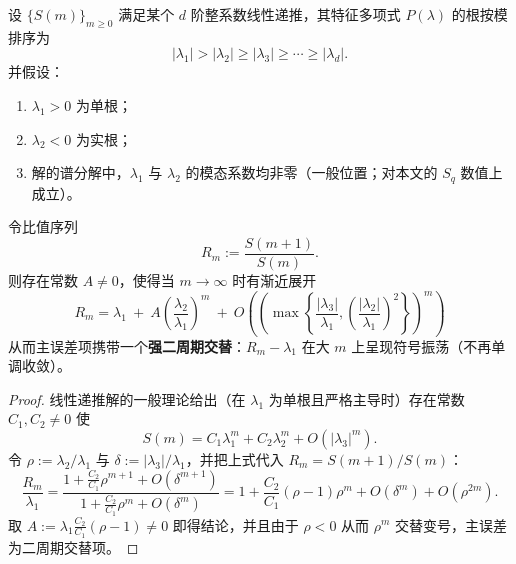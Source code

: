 \begin{proposition}\label{prop:pom-resonance-two-cycle-ratio}
设 \(\{S(m)\}_{m\ge 0}\) 满足某个 \(d\) 阶整系数线性递推，其特征多项式 \(P(\lambda)\) 的根按模排序为
\[
|\lambda_1|>|\lambda_2|\ge|\lambda_3|\ge\cdots\ge|\lambda_d|.
\]
并假设：
\begin{enumerate}
  \item \(\lambda_1>0\) 为单根；
  \item \(\lambda_2<0\) 为实根；
  \item 解的谱分解中，\(\lambda_1\) 与 \(\lambda_2\) 的模态系数均非零（一般位置；对本文的 \(S_q\) 数值上成立）。
\end{enumerate}
令比值序列
\[
R_m:=\frac{S(m+1)}{S(m)}.
\]
则存在常数 \(A\neq 0\)，使得当 \(m\to\infty\) 时有渐近展开
\[
\boxed{\;
R_m=\lambda_1\ +\ A\left(\frac{\lambda_2}{\lambda_1}\right)^{m}\ +\ O\!\left(\left(\max\!\left\{\frac{|\lambda_3|}{\lambda_1},\left(\frac{|\lambda_2|}{\lambda_1}\right)^2\right\}\right)^{m}\right)\;}
\]
从而主误差项携带一个\textbf{强二周期交替}：\(R_m-\lambda_1\) 在大 \(m\) 上呈现符号振荡（不再单调收敛）。
\end{proposition}
\begin{proof}
线性递推解的一般理论给出（在 \(\lambda_1\) 为单根且严格主导时）存在常数 \(C_1,C_2\neq 0\) 使
\[
S(m)=C_1\lambda_1^m+C_2\lambda_2^m+O(|\lambda_3|^m).
\]
令 \(\rho:=\lambda_2/\lambda_1\) 与 \(\delta:=|\lambda_3|/\lambda_1\)，并把上式代入
\(
R_m=S(m+1)/S(m)
\)：
\[
\frac{R_m}{\lambda_1}
=\frac{1+\frac{C_2}{C_1}\rho^{m+1}+O(\delta^{m+1})}{1+\frac{C_2}{C_1}\rho^{m}+O(\delta^{m})}
=1+\frac{C_2}{C_1}(\rho-1)\rho^{m}+O(\delta^m)+O(\rho^{2m}).
\]
取 \(A:=\lambda_1\frac{C_2}{C_1}(\rho-1)\neq 0\) 即得结论，并且由于 \(\rho<0\) 从而 \(\rho^m\) 交替变号，主误差为二周期交替项。
\end{proof}

